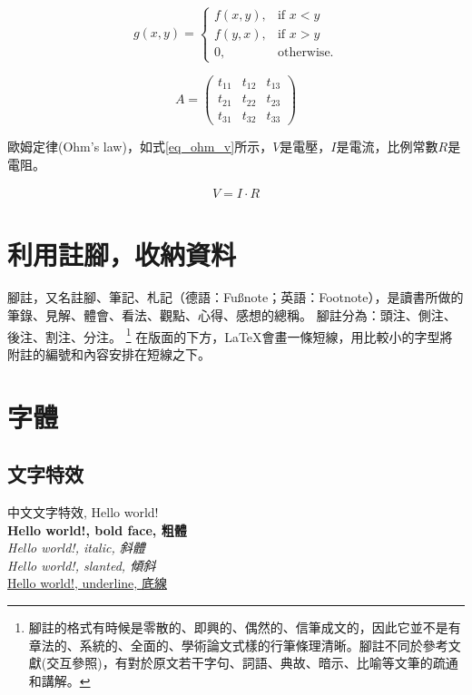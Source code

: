 \begin{equation}
   g(x,y) = \left\{\begin{array}{ll}
      f(x,y), & \mbox{if $x<y$} \\  %
      f(y,x), & \mbox{if $x>y$} \\  %
      0,      & \mbox{otherwise.}
     \end{array} \right.
\end{equation}

\begin{equation}
   A =\begin{pmatrix}                %
  t_{11} & t_{12} & t_{13} \\
  t_{21} & t_{22} & t_{23} \\
  t_{31} & t_{32} & t_{33}
   \end{pmatrix}
\end{equation}
\vspace*{3em}

歐姆定律(Ohm's law)，如式\ref{eq_ohm_v}所示，$V$是電壓，$I$是電流，比例常數$R$是電阻。

\begin{equation}\label{eq_ohm_v}
    \begin{split}
        V = I \cdot R
    \end{split}
\end{equation}
\clearpage

\section{利用註腳，收納資料}
腳註，又名註腳、筆記、札記（德語：Fußnote；英語：Footnote），是讀書所做的筆錄、見解、體會、看法、觀點、心得、感想的總稱。
腳註分為：頭注、側注、後注、割注、分注。
\footnote{腳註的格式有時候是零散的、即興的、偶然的、信筆成文的，因此它並不是有章法的、系統的、全面的、學術論文式樣的行筆條理清晰。腳註不同於參考文獻(交互參照)，有對於原文若干字句、詞語、典故、暗示、比喻等文筆的疏通和講解。}
在版面的下方，\LaTeX 會畫一條短線，用比較小的字型將附註的編號和內容安排在短線之下。


\section{字體}
\subsection{文字特效}
中文文字特效, Hello world!\\
{\LARGE
\textbf{Hello world!, bold face, 粗體} \\
\textit{Hello world!, italic, 斜體} \\
\textsl{Hello world!, slanted, 傾斜} \\
\underline{Hello world!, underline, 底線} \\
}

